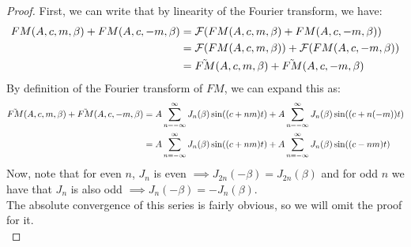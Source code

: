 \documentclass[11pt,twoside]{report}
\numberwithin{thm}{section}
\numberwithin{equation}{section}
\begin{document}
\begin{proof} First, we can write that by linearity of the Fourier transform, we have:
\begin{align*}
    FM(A, c, m, \beta) + FM(A, c, -m, \beta) &= \mathcal{F}(FM(A, c, m, \beta) + FM(A, c, -m, \beta)) \\
    &= \mathcal{F}(FM(A, c, m, \beta)) + \mathcal{F}(FM(A, c, -m, \beta))\\
    &=\Tilde{FM}(A, c, m, \beta) + \Tilde{FM}(A, c, -m, \beta)
\end{align*}
By definition of the Fourier transform of $FM$, we can expand this as:
\begin{align*}
    \Tilde{FM}(A, c, m, \beta) + \Tilde{FM}(A, c, -m, \beta) &= A \sum_{n=-\infty}^\infty J_n(\beta) \sin((c + nm)t) + A \sum_{n=-\infty}^\infty J_n(\beta) \sin((c + n(-m))t)\\
    &= A \sum_{n=-\infty}^\infty J_n(\beta) \sin((c + nm)t) + A \sum_{n=-\infty}^\infty J_n(\beta) \sin((c - nm)t)
\end{align*}
Now, note that for even $n$, $J_n$ is even $\implies J_{2n}(-\beta) = J_{2n}(\beta)$ and for odd $n$ we have that $J_{n}$ is also odd $\implies J_{n}(-\beta) = -J_{n}(\beta)$.\\

The absolute convergence of this series is fairly obvious, so we will omit the proof for it. \\


\end{proof}
\end{document}
